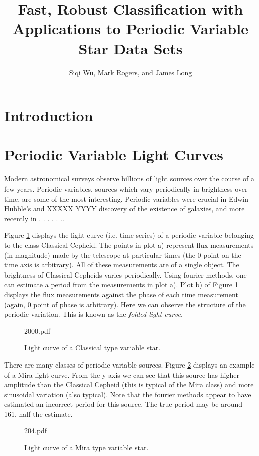 \documentclass[11pt]{article}
\begin{document}
\title{Fast, Robust Classification with Applications to Periodic Variable Star Data Sets}
\author{Siqi Wu, Mark Rogers, and James Long}
\maketitle


\section{Introduction}

\section{Periodic Variable Light Curves}
Modern astronomical surveys observe billions of light sources over the course of a few years. Periodic variables, sources which vary periodically in brightness over time, are some of the most interesting. Periodic variables were crucial in Edwin Hubble's and XXXXX YYYY discovery of the existence of galaxies, and more recently in . . . . . ..

Figure \ref{fig:cepheid} displays the light curve (i.e. time series) of a periodic variable belonging to the class Classical Cepheid. The points in plot a) represent flux measurements (in magnitude) made by the telescope at particular times (the 0 point on the time axis is arbitrary). All of these measurements are of a single object. The brightness of Classical Cepheids varies periodically. Using fourier methods, one can estimate a period from the measurements in plot a).  Plot b) of Figure \ref{fig:cepheid} displays the flux measurements against the phase of each time measurement (again, 0 point of phase is arbitrary). Here we can observe the structure of the periodic variation. This is known as the \textit{folded light curve}. 
\begin{figure}[h]
  \begin{center}
    \begin{includegraphics}[scale=.5]{2000.pdf}
      \caption{Light curve of a Classical type variable star.\label{fig:cepheid}}
    \end{includegraphics}
  \end{center}
\end{figure}

There are many classes of periodic variable sources. Figure \ref{fig:mira} displays an example of a Mira light curve. From the y-axis we can see that this source has higher amplitude than the Classical Cepheid (this is typical of the Mira class) and more sinusoidal variation (also typical). Note that the fourier methods appear to have estimated an incorrect period for this source. The true period may be around 161, half the estimate.    
\begin{figure}[h]
  \begin{center}
    \begin{includegraphics}[scale=.5]{204.pdf}
      \caption{Light curve of a Mira type variable star.\label{fig:mira}}
    \end{includegraphics}
  \end{center}
\end{figure}
\end{document}
